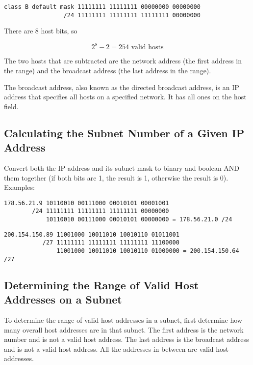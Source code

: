 \begin{verbatim}
class B default mask 11111111 11111111 00000000 00000000
                 /24 11111111 11111111 11111111 00000000
\end{verbatim}

There are 8 host bits, so

\begin{equation}
2 ^ 8 - 2 = 254 \mbox{ valid hosts}
\end{equation}

The two hosts that are subtracted are the network address (the first address in
the range) and the broadcast address (the last address in the range).

The broadcast address, also known as the directed broadcast address, is an IP
address that specifies all hosts on a specified network. It has all ones on the
host field.

\subsection{Calculating the Subnet Number of a Given IP Address}

Convert both the IP address and its subnet mask to binary and boolean AND
them together (if both bits are 1, the result is 1, otherwise the result is
0).\\

Examples:

\begin{verbatim}
178.56.21.9 10110010 00111000 00010101 00001001
        /24 11111111 11111111 11111111 00000000
            10110010 00111000 00010101 00000000 = 178.56.21.0 /24
\end{verbatim}

\begin{verbatim}
200.154.150.89 11001000 10011010 10010110 01011001
           /27 11111111 11111111 11111111 11100000
               11001000 10011010 10010110 01000000 = 200.154.150.64 /27
\end{verbatim}

\subsection{Determining the Range of Valid Host Addresses on a Subnet}

To determine the range of valid host addresses in a subnet, first determine
how many overall host addresses are in that subnet. The first address is the
network number and is not a valid host address. The last address is the
broadcast address and is not a valid host address. All the addresses in
between are valid host addresses.\\

